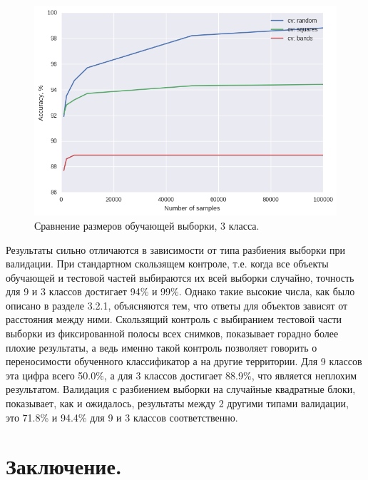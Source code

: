 \documentclass[14pt]{extarticle}
\begin{document}
\begin{figure}[H]
\centering
\includegraphics[width=\linewidth]{imgs/map_validations_3_classes.png}
\caption{Сравнение размеров обучающей выборки, 3 класса.}
\label{image:map_val_3}
\end{figure}
Результаты сильно отличаются в зависимости от типа разбиения выборки при валидации.
При стандартном скользящем контроле, т.е. когда все объекты обучающей и тестовой частей
выбираются их всей выборки случайно, точность для 9 и 3 классов достигает 94\% и 99\%.
Однако такие высокие числа, как было описано в разделе 3.2.1, объясняются тем, что ответы
для объектов зависят от расстояния между ними. Скользящий контроль с выбиранием тестовой части
выборки из фиксированной полосы всех снимков, показывает горадно более плохие результаты, а 
ведь именно такой контроль позволяет говорить о переносимости обученного классификатор а на 
другие территории. Для 9 классов эта цифра всего 50.0\%, а для 3 классов достигает
88.9\%, что является неплохим результатом. Валидация с разбиением выборки на 
случайные квадратные блоки, показывает, как и ожидалось, результаты между
2 другими типами валидации, это 71.8\% и 94.4\% для 9 и 3 классов соответственно.

\section{Заключение.}
\end{document}
